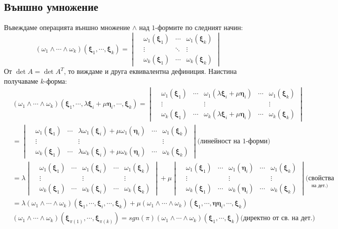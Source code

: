 \documentclass[12pt]{article}
\newcommand\myxi[0]{\boldsymbol{\xi}}
\newcommand\myeta[0]{\boldsymbol{\eta}}
\begin{document}
\begin{large}
\subsection{Външно умножение}
Въвеждаме операцията външно множение $\wedge$ над $1$-формите по следният начин:
\[
(\omega_1 \wedge \cdots \wedge \omega_k)(\myxi_1,\cdots,\myxi_k)=
\begin{vmatrix}
&\omega_1(\myxi_1) &\cdots &\omega_1(\myxi_k) \\
&\vdots &\ddots &\vdots \\
&\omega_k(\myxi_1) &\cdots &\omega_k(\myxi_k) 
\end{vmatrix} 
\]
От $\det A = \det A^T$, то виждаме и друга еквивалентна дефиниция. Наистина получаваме $k$-форма:
\begin{align*}
&(\omega_1 \wedge \cdots \wedge \omega_k)(\myxi_1,\cdots,\lambda\myxi_i+\mu\myeta_i,\cdots,\myxi_k)=
\begin{vmatrix}
&\omega_1(\myxi_1) &\cdots &\omega_1(\lambda\myxi_i+\mu\myeta_i) &\cdots &\omega_1(\myxi_k) \\
&\vdots &\ &\vdots &\ &\vdots \\
&\omega_k(\myxi_1) &\cdots &\omega_k(\lambda\myxi_i+\mu\myeta_i) &\cdots &\omega_k(\myxi_k) 
\end{vmatrix} \\
&=\begin{vmatrix}
&\omega_1(\myxi_1) &\cdots &\lambda\omega_1(\myxi_i)+\mu\omega_1(\myeta_i) &\cdots &\omega_1(\myxi_k) \\
&\vdots &\ &\vdots &\ &\vdots \\
&\omega_k(\myxi_1) &\cdots &\lambda\omega_k(\myxi_i)+\mu\omega_k(\myeta_i) &\cdots &\omega_k(\myxi_k) 
\end{vmatrix} \text{(линейност на $1$-форми)} \\
&=\lambda\begin{vmatrix}
&\omega_1(\myxi_1) &\cdots &\omega_1(\myxi_i) &\cdots &\omega_1(\myxi_k) \\
&\vdots &\ &\vdots &\ &\vdots \\
&\omega_k(\myxi_1) &\cdots &\omega_k(\myxi_i) &\cdots &\omega_k(\myxi_k) 
\end{vmatrix}+\mu
\begin{vmatrix}
&\omega_1(\myxi_1) &\cdots &\omega_1(\myeta_i) &\cdots &\omega_1(\myxi_k) \\
&\vdots &\ &\vdots &\ &\vdots \\
&\omega_k(\myxi_1) &\cdots &\omega_k(\myeta_i) &\cdots &\omega_k(\myxi_k) 
\end{vmatrix} \underset{\text{на дет.)}}{\text{(свойства}} \\
&=\lambda(\omega_1 \wedge \cdots \wedge \omega_k)(\myxi_1,\cdots,\myxi_i,\cdots,\myxi_k)+\mu(\omega_1 \wedge \cdots \wedge \omega_k)(\myxi_1,\cdots,\myeta\myeta_i,\cdots,\myxi_k) \\
&(\omega_1 \wedge \cdots \wedge \omega_k)(\myxi_{\pi(1)},\cdots,\myxi_{\pi(k)})=sgn(\pi)(\omega_1 \wedge \cdots \wedge \omega_k)(\myxi_1,\cdots,\myxi_k) \text{(директно от св. на дет.)}
\end{align*}


\end{large}
\end{document}
